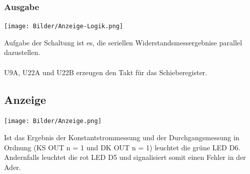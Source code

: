 \documentclass[a4paper,11pt]{scrartcl}
\begin{document}
\newpage
\subsubsection{Ausgabe}
\begin{center}
\texttt{[image: Bilder/Anzeige-Logik.png]}
\end{center}

Aufgabe der Schaltung ist es, die seriellen Widerstandsmessergebnise parallel dazustellen. 
\\
\\
U9A, U22A und U22B erzeugen den Takt für das Schieberegister. 

\newpage
\subsection{Anzeige}

\begin{center}
\texttt{[image: Bilder/Anzeige.png]}
\end{center}

Ist das Ergebnis der Konstantstrommessung und der Durchgangsmessung in Ordnung (KS OUT n = 1 und DK OUT n = 1) leuchtet die grüne LED D6.
\\

Andernfalls leuchtet die rot LED D5 und signalisiert somit einen Fehler in der Ader. 
\end{document}

